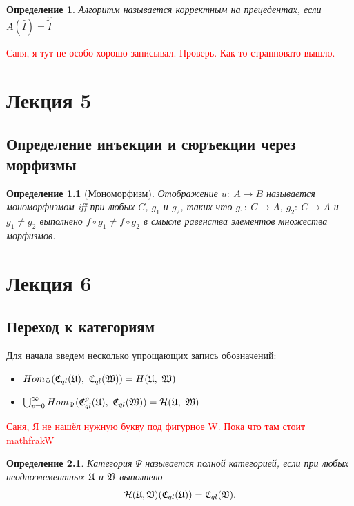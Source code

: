\documentclass[a4paper, 12pt]{report}
\newtheorem{definition}{Определение}[chapter]
\begin{document}
\begin{definition}
Алгоритм называется корректным на прецедентах, если $A(\hat{I}) = \hat{\tilde{I}}$
\end{definition}
\textcolor{red}{Саня, я тут не особо хорошо записывал. Проверь. Как то странновато вышло.}

\chapter{Лекция 5}
\section{Определение инъекции и сюръекции через морфизмы}

\begin{definition}[Мономорфизм]
Отображение $u:\ A \rightarrow B$ называется мономорфизмом iff при любых $C$, $g_1$ и $g_2$, таких что $g_1:\ C \rightarrow A$, $g_2:\ C \rightarrow A$ и $g_1 \neq g_2$ выполнено $f \circ g_1 \neq f \circ g_2$ в смысле равенства элементов множества морфизмов.
\end{definition}

\chapter{Лекция 6}
\section{Переход к категориям}
Для начала введем несколько упрощающих запись обозначений:
\begin{itemize}
  \item $Hom_{\Psi}(\Cql(\frakU),\ \Cql(\frakW)) = H(\frakU,\ \frakW)$ 
  \item $\bigcup_{p=0}^{\infty}Hom_{\Psi}(\Cql^p(\frakU),\ \Cql(\frakW)) = \calH(\frakU,\ \frakW)$
\end{itemize}
\textcolor{red}{Саня, Я не нашёл нужную букву под фигурное W. Пока что там стоит mathfrak{W}}
\begin{definition}
Категория $\Psi$ называется полной категорией, если при любых неодноэлементных $\mathfrak{U}$ и $\mathfrak{V}$ выполнено
\[
\mathcal{H}(\mathfrak{U}, \mathfrak{V})(\mathfrak{C}_{ql}(\mathfrak{U})) = \mathfrak{C}_{ql}(\mathfrak{V}).
\]
\end{definition}
\end{document}
